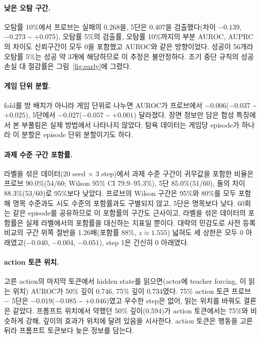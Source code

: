 \documentclass[11pt]{article}
\begin{document}
\paragraph{낮은 오탐 구간.} 오탐률 10\%에서 프로브는 실패의 0.268을, 5단은 0.407을 검출했다(차이 $-0.139$, $-0.273$ \textasciitilde{} $+0.075$). 오탐률 5\%의 검출률, 오탐률 10\%까지의 부분 AUROC, AUPRC의 차이도 신뢰구간이 모두 0을 포함했고 AUROC와 같은 방향이었다. 성공이 56개라 오탐률 5\%는 성공 약 3개에 해당하므로 이 추정은 불안정하다. 조기 중단 규칙의 성공 손실 대 절감률은 그림~\ref{fig:early}에 그렸다.

\paragraph{게임 단위 분할.} fold를 방 배치가 아니라 게임 단위로 나누면 AUROC가 프로브에서 $-0.006$($-0.037$ \textasciitilde{} $+0.025$), 5단에서 $-0.027$($-0.057$ \textasciitilde{} $+0.001$) 달라졌다. 장면 정보만 담은 합성 특징에서 본 부풀림은 실제 방법에서 나타나지 않았다. 탐욕 데이터는 게임당 episode가 하나라 이 분할은 episode 단위 분할이기도 하다.

\paragraph{과제 수준 구간 포함률.} 라벨을 섞은 데이터(20 seed $\times$ 3 step)에서 과제 수준 구간이 귀무값을 포함한 비율은 프로브 90.0\%(54/60; Wilson 95\% CI 79.9--95.3\%), 5단 85.0\%(51/60), 둘의 차이 88.3\%(53/60)로 95\%보다 낮았다. 프로브의 Wilson 구간은 95\%와 80\%를 모두 포함해 명목 수준과도 시도 수준의 포함률과도 구별되지 않고, 5단은 명목보다 낮다. 60회는 같은 episode를 공유하므로 이 포함률의 구간도 근사이고, 라벨을 섞은 데이터의 포함률은 실제 라벨에서의 포함률을 대신하는 지표일 뿐이다. 대략의 민감도로 사전 등록 비교의 구간 위쪽 절반을 1.26배(포함률 88\%, $z \approx 1.555$) 넓혀도 세 상한은 모두 0 아래였고($-0.040$, $-0.004$, $-0.051$), step 1은 간신히 0 아래였다.

\paragraph{action 토큰 위치.} 고른 action의 마지막 토큰에서 hidden state를 읽으면(actor에 teacher forcing, \cite{ruan2026doomed}이 읽는 위치) AUROC가 50\% 깊이 0.746, 75\% 깊이 0.734였다. 75\% action 토큰 프로브 $-$ 5단은 $-0.019$($-0.085$ \textasciitilde{} $+0.046$)였고 우수한 step은 없어, 읽는 위치를 바꿔도 결론은 같았다. 프롬프트 위치에서 약했던 50\% 깊이(0.594)가 action 토큰에서는 75\%와 비슷하게 강해, 깊이의 효과가 위치에 달려 있음을 시사한다. action 토큰은 행동을 고른 뒤라 프롬프트 토큰보다 늦은 정보를 담는다.
\end{document}
